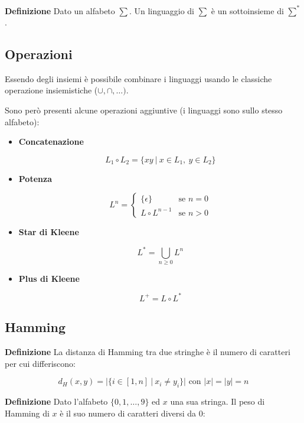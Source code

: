 \documentclass{article}
\begin{document}
\noindent\textbf{Definizione} Dato un alfabeto $\sum$. Un linguaggio di $\sum$ è un sottoinsieme di $\sum^*$.

\newpage

\subsection{Operazioni}

Essendo degli insiemi è possibile combinare i linguaggi usando le classiche operazione insiemistiche ($\cup,\cap,\ldots)$.\newline

\noindent Sono però presenti alcune operazioni aggiuntive (i linguaggi sono sullo stesso alfabeto):\newline
\begin{itemize}
    \item \textbf{Concatenazione}

$$L_1\circ L_2=\{xy\ |\ x\in L_1,\ y\in L_2\}$$

    \item \textbf{Potenza}
    
\[
L^n =
\begin{cases}
\{\epsilon\} & \text{se } n=0 \\
L\circ L^{n-1} & \text{se } n>0
\end{cases}
\]

\item \textbf{Star di Kleene}

$$L^* = \bigcup_{n\geq0}L^n$$

\item \textbf{Plus di Kleene}

$$L^+ = L\circ L^*$$\newline
    
\end{itemize}

\subsection{Hamming}

\textbf{Definizione} La distanza di Hamming tra due stringhe è il numero di caratteri per cui differiscono:

$$d_H(x,y)=|\{i\in[1,n]\ |\ x_i\neq y_i\}| \text{ con }|x|=|y|=n$$\newline

\noindent\textbf{Definizione} Dato l'alfabeto $\{0,1,\ldots,9\}$ ed $x$ una sua stringa. Il peso di Hamming di $x$ è il suo  numero di caratteri diversi da 0:
\end{document}
